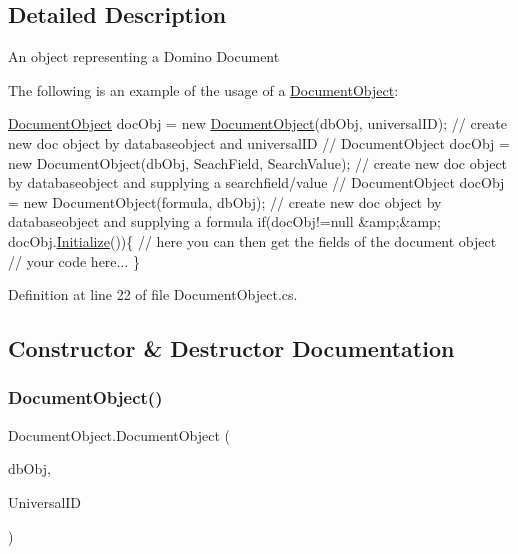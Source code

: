 \subsection{Detailed Description}
An object representing a Domino Document 

The following is an example of the usage of a {\ttfamily \mbox{\hyperlink{class_document_object}{Document\+Object}}}\+: 
\begin{DoxyCode}
\mbox{\hyperlink{class_document_object}{DocumentObject}} docObj = \textcolor{keyword}{new} \mbox{\hyperlink{class_document_object_a46c89e7d40b15a91542a5482b2d8a084}{DocumentObject}}(dbObj, universalID); \textcolor{comment}{// create new
       doc object by databaseobject and universalID}
\textcolor{comment}{// DocumentObject docObj = new DocumentObject(dbObj, SeachField, SearchValue); // create new doc object by
       databaseobject and supplying a searchfield/value}
\textcolor{comment}{// DocumentObject docObj = new DocumentObject(formula, dbObj); // create new doc object by databaseobject
       and supplying a formula}
\textcolor{keywordflow}{if}(docObj!=null &amp;&amp; docObj.\mbox{\hyperlink{class_document_object_af4298d6cfbb9ea60643d9995309b73f1}{Initialize}}())\{
     \textcolor{comment}{// here you can then get the fields of the document object}
     \textcolor{comment}{// your code here...}
\}
\end{DoxyCode}
 

Definition at line 22 of file Document\+Object.\+cs.



\subsection{Constructor \& Destructor Documentation}
\mbox{\label{class_document_object_a46c89e7d40b15a91542a5482b2d8a084}} 
\subsubsection{\texorpdfstring{Document\+Object()}{DocumentObject()}\hspace{0.1cm}{\footnotesize\ttfamily [1/3]}}
{\footnotesize\ttfamily Document\+Object.\+Document\+Object (\begin{DoxyParamCaption}\item[{\mbox{\hyperlink{class_database_object}{Database\+Object}}}]{db\+Obj,  }\item[{String}]{Universal\+ID }\end{DoxyParamCaption})}



